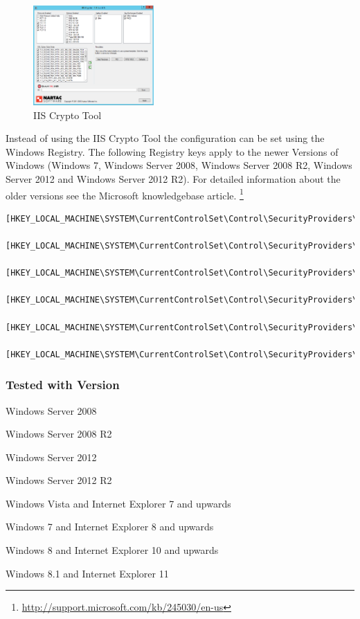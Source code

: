\begin{figure}[p]
  \centering
  \includegraphics[width=0.411\textwidth]{img/IISCryptoConfig.png}
  \caption{IIS Crypto Tool}
  \label{fig:IISCryptoConfig}
\end{figure}

Instead of using the IIS Crypto Tool the configuration can be set
using the Windows Registry. The following Registry keys apply to the
newer Versions of Windows (Windows 7, Windows Server 2008, Windows
Server 2008 R2, Windows Server 2012 and Windows Server 2012 R2). For detailed
information about the older versions see the Microsoft knowledgebase
article. \footnote{\url{http://support.microsoft.com/kb/245030/en-us}}
\begin{lstlisting}[breaklines]
  [HKEY_LOCAL_MACHINE\SYSTEM\CurrentControlSet\Control\SecurityProviders\Schannel]
  [HKEY_LOCAL_MACHINE\SYSTEM\CurrentControlSet\Control\SecurityProviders\Schannel\Ciphers]
  [HKEY_LOCAL_MACHINE\SYSTEM\CurrentControlSet\Control\SecurityProviders\Schannel\CipherSuites]
  [HKEY_LOCAL_MACHINE\SYSTEM\CurrentControlSet\Control\SecurityProviders\Schannel\Hashes]
  [HKEY_LOCAL_MACHINE\SYSTEM\CurrentControlSet\Control\SecurityProviders\Schannel\KeyExchangeAlgorithms]
  [HKEY_LOCAL_MACHINE\SYSTEM\CurrentControlSet\Control\SecurityProviders\Schannel\Protocols]
\end{lstlisting}

\subsubsection{Tested with Version}
\begin{itemize*}
  \item Windows Server 2008
  \item Windows Server 2008 R2
  \item Windows Server 2012
  \item Windows Server 2012 R2
\end{itemize*}

\begin{itemize*}
  \item Windows Vista and Internet Explorer 7 and upwards
  \item Windows 7 and Internet Explorer 8 and upwards
  \item Windows 8 and Internet Explorer 10 and upwards
  \item Windows 8.1 and Internet Explorer 11
\end{itemize*}






